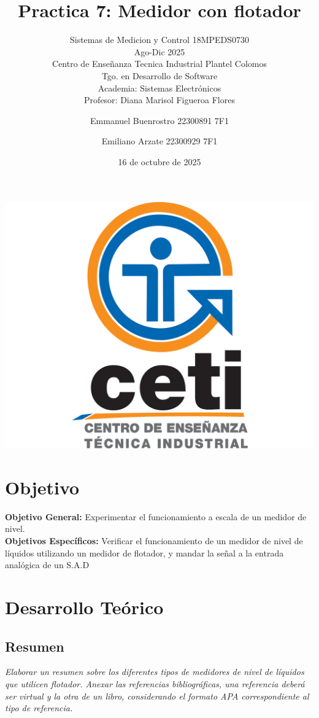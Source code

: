 \documentclass[11pt]{scrartcl}
\title {Practica 7: Medidor con flotador}
\subtitle{Sistemas de Medicion y Control 18MPEDS0730 \\ Ago-Dic 2025 \\ Centro de Enseñanza Tecnica Industrial Plantel Colomos\\Tgo. en Desarrollo de Software \\ Academia: Sistemas Electrónicos\\Profesor: Diana Marisol Figueroa Flores }
\date{16 de octubre de 2025}
\author{Emmanuel Buenrostro 22300891 7F1 \\ \and Emiliano Arzate 22300929 7F1 \\}
\newcommand{\indicacion}[1]{\noindent\textit{\small #1}}
\begin{document}
\maketitle
\begin{center}
   \includegraphics[scale=0.15]{../../cetilogo.jpg} 
\end{center}
\newpage


\section{Objetivo}

\textbf{Objetivo General:}
Experimentar el funcionamiento a escala de un medidor de nivel.
\\


\textbf{Objetivos Específicos:} 
Verificar el funcionamiento de un medidor de nivel de líquidos utilizando un medidor de flotador, y mandar la señal a la entrada analógica de un S.A.D

\section{Desarrollo Teórico}

\subsection{Resumen }

\indicacion{
Elaborar un resumen sobre los diferentes tipos de medidores de nivel de líquidos que utilicen flotador. Anexar las referencias bibliográficas, una referencia deberá ser virtual y la otra de un libro, considerando el formato APA correspondiente al tipo de referencia.}
\end{document}
